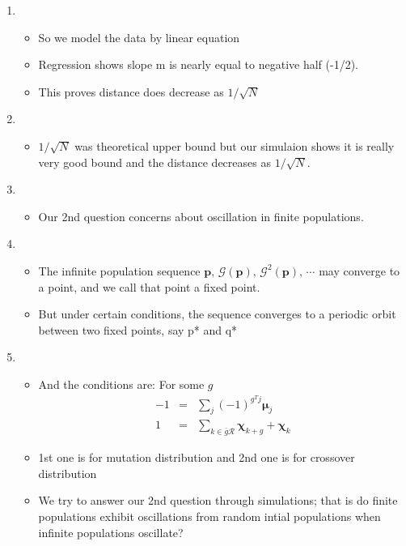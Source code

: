 \documentclass{article}
\begin{document}
\begin{enumerate}
\item
  \begin{itemize}
  \item So we model the data by linear equation
  \item Regression shows slope m is nearly equal to negative half (-1/2).
  \item This proves distance does decrease as $1/\sqrt{N}$  
  \end{itemize}

\item
  \begin{itemize}
  \item $1/\sqrt{N}$ was theoretical upper bound 
  but our simulaion shows it is really very good bound 
  and the distance decreases as $1/\sqrt{N}$. 
  \end{itemize}
    
\item 
  \begin{itemize}
  \item Our 2nd question concerns about oscillation in
    finite populations.
  \end{itemize}
    
\item
  \begin{itemize}
  \item The infinite population sequence  $\bm{p}, \, \mathcal{G}(\bm{p}), \, {\mathcal{G}}^2(\bm{p}), \, \cdots$ may
    converge to a point, and we call that point a fixed point.
  \item But under certain conditions, the sequence converges to a
    periodic orbit between two fixed points, say p* and q*
\end{itemize}

\item
  \begin{itemize}
  \item And the conditions are: For some $g$
  \begin{eqnarray*}
      -1 &=& \sum \limits_{j} (-1)^{g^T j} \bm{\mu}_j \\
      1 &=& \sum \limits_{k \in \bar{g}\mathcal{R}} \bm{\chi}_{k+g} + \bm{\chi}_k 
      \end{eqnarray*}
  \item 1st one is for mutation distribution and 2nd one is for crossover distribution
  \item We try to answer our 2nd question through simulations; that is do finite populations exhibit
     oscillations from random intial populations when infinite populations oscillate?
  \end{itemize}
    

\end{enumerate}
\end{document}
